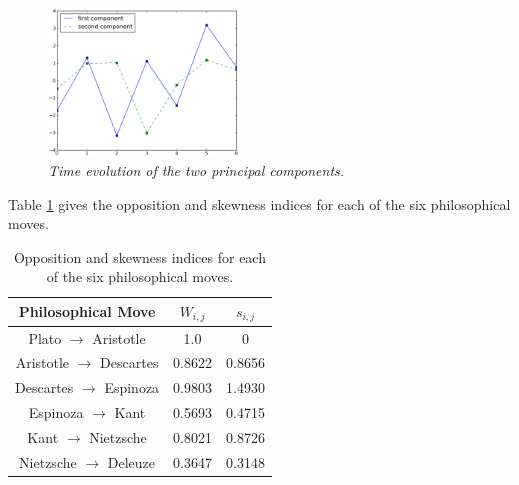 \documentclass[%
 aip,
 jmp,%
 amsmath,amssymb,
 reprint,%
]{revtex4-1}
\begin{document}
\begin{figure}
        \begin{center}
                \includegraphics[width=0.45\textwidth]{evolTemp_}
        \end{center}
        \caption{\it Time evolution of the two principal components.}
        \label{fig:time}
\end{figure}


Table \ref{tab:tableOI} gives the opposition and skewness indices
for each of the six philosophical moves.

\begin{table}%
\caption{\label{tab:tableOI}Opposition and skewness indices for each
of the six philosophical moves.  }

\begin{tabular}{|c||c|c|}
\hline
Philosophical Move & $W_{i,j}$ & $s_{i,j}$ \\
\hline \hline
Plato $\rightarrow$ Aristotle &  1.0 & 0 \\
Aristotle $\rightarrow$ Descartes & 0.8622 & 0.8656 \\
Descartes $\rightarrow$ Espinoza & 0.9803 & 1.4930 \\
Espinoza $\rightarrow$ Kant & 0.5693 & 0.4715 \\
Kant $\rightarrow$ Nietzsche & 0.8021 & 0.8726 \\
Nietzsche $\rightarrow$ Deleuze & 0.3647 & 0.3148 \\
\hline
\end{tabular}
\end{table}
\end{document}
